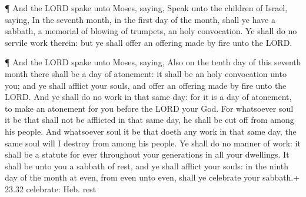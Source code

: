  ¶ And the LORD spake unto Moses, saying, 
Speak unto the children of Israel, saying, In the seventh month, in the
first day of the month, shall ye have a sabbath, a memorial of blowing
of trumpets, an holy convocation.  Ye shall do no servile
work therein: but ye shall offer an offering made by fire unto the LORD.

 ¶ And the LORD spake unto Moses, saying, 
Also on the tenth day of this seventh month there shall be a day of
atonement: it shall be an holy convocation unto you; and ye shall
afflict your souls, and offer an offering made by fire unto the LORD.
 And ye shall do no work in that same day: for it is a day
of atonement, to make an atonement for you before the LORD your God.
 For whatsoever soul it be that shall not be afflicted in
that same day, he shall be cut off from among his people. 
And whatsoever soul it be that doeth any work in that same day, the same
soul will I destroy from among his people.  Ye shall do no
manner of work: it shall be a statute for ever throughout your
generations in all your dwellings.  It shall be unto you a
sabbath of rest, and ye shall afflict your souls: in the ninth day of
the month at even, from even unto even, shall ye celebrate your
sabbath.+ 23.32 celebrate: Heb. rest

